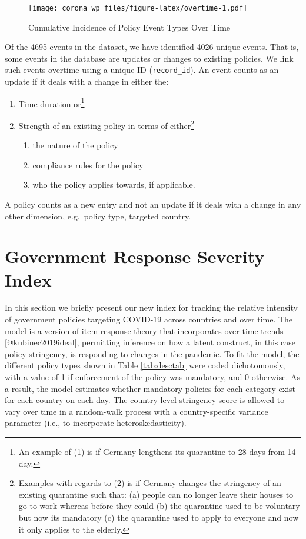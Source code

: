\documentclass[]{article}
\providecommand{\tightlist}{%
  \setlength{\itemsep}{0pt}\setlength{\parskip}{0pt}}
\let\rmarkdownfootnote\footnote%
\def\footnote{\protect\rmarkdownfootnote}
\begin{document}
\begin{figure}
\centering
\texttt{[image: corona\_wp\_files/figure-latex/overtime-1.pdf]}
\caption{\label{fig:overtime}Cumulative Incidence of Policy Event Types Over Time}
\end{figure}

Of the 4695 events in the dataset, we have identified 4026 unique events. That is, some events in the database are updates or changes to existing policies. We link such events overtime using a unique ID (\texttt{record\_id}). An event counts as an update if it deals with a change in either the:

\begin{enumerate}
\def\labelenumi{\arabic{enumi}.}
\tightlist
\item
  Time duration or\footnote{An example of (1) is if Germany lengthens its quarantine to 28 days from 14 day.}
\item
  Strength of an existing policy in terms of either\footnote{Examples with regards to (2) is if Germany changes the stringency of an existing quarantine such that: (a) people can no longer leave their houses to go to work whereas before they could (b) the quarantine used to be voluntary but now its mandatory (c) the quarantine used to apply to everyone and now it only applies to the elderly.}

  \begin{enumerate}
  \def\labelenumii{\alph{enumii}.}
  \tightlist
  \item
    the nature of the policy
  \item
    compliance rules for the policy
  \item
    who the policy applies towards, if applicable.
  \end{enumerate}
\end{enumerate}

A policy counts as a new entry and not an update if it deals with a change in any other dimension, e.g.~policy type, targeted country.

\hypertarget{government-response-severity-index}{%
\section{Government Response Severity Index}\label{government-response-severity-index}}

In this section we briefly present our new index for tracking the relative intensity of government policies targeting COVID-19 across countries and over time. The model is a version of item-response theory that incorporates over-time trends {[}@kubinec2019ideal{]}, permitting inference on how a latent construct, in this case policy stringency, is responding to changes in the pandemic. To fit the model, the different policy types shown in Table \ref{tab:desctab} were coded dichotomously, with a value of 1 if enforcement of the policy was mandatory, and 0 otherwise. As a result, the model estimates whether mandatory policies for each category exist for each country on each day. The country-level stringency score is allowed to vary over time in a random-walk process with a country-specific variance parameter (i.e., to incorporate heteroskedasticity).
\end{document}

